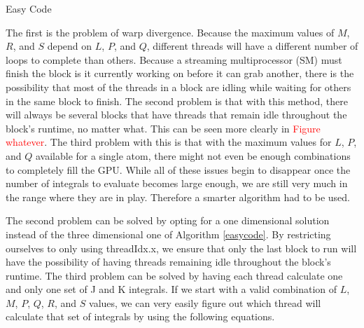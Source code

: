 \documentclass[12pt]{book}
\newcommand{\notetodylan}[1]{\textcolor{red}{#1}} %
\begin{document}
\begin{algorithm}
\caption{Easy Code}
\label{easycode}
\begin{algorithmic}

\STATE{}
				\ELSE
				\ENDIF
					\ELSE
					\ENDIF
					\ENDFOR
				\ENDFOR
			\ENDFOR
\ENDIF
\end{algorithmic}
\end{algorithm}

The first is the problem of warp divergence. Because the maximum values of $M$, $R$, and $S$ depend on $L$, $P$, and $Q$, different threads will have a different number of loops to complete than others. Because a streaming multiprocessor (SM) must finish the block is it currently working on before it can grab another, there is the possibility that most of the threads in a block are idling while waiting for others in the same block to finish. The second problem is that with this method, there will always be several blocks that have threads that remain idle throughout the block's runtime, no matter what. This can be seen more clearly in \notetodylan{Figure whatever}. The third problem with this is that with the maximum values for $L$, $P$, and $Q$ available for a single atom, there might not even be enough combinations to completely fill the GPU. While all of these issues begin to disappear once the number of integrals to evaluate becomes large enough, we are still very much in the range where they are in play. Therefore a smarter algorithm had to be used.

The second problem can be solved by opting for a one dimensional solution instead of the three dimensional one of Algorithm \ref{easycode}. By restricting ourselves to only using threadIdx.x, we ensure that only the last block to run will have the possibility of having threads remaining idle throughout the block's runtime. The third problem can be solved by having each thread calculate one and only one set of J and K integrals. If we start with a valid combination of $L$, $M$, $P$, $Q$, $R$, and $S$ values, we can very easily figure out which thread will calculate that set of integrals by using the following equations.
\end{document}
